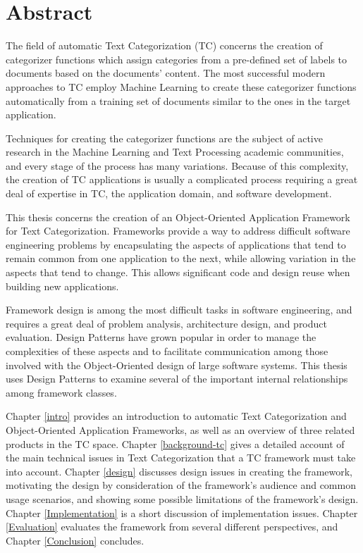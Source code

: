 \chapter{Abstract}

The field of automatic Text Categorization (TC) concerns the creation
of categorizer functions which assign categories from a pre-defined
set of labels to documents based on the documents' content.  The most
successful modern approaches to TC employ Machine Learning to create
these categorizer functions automatically from a training set of
documents similar to the ones in the target application.

Techniques for creating the categorizer functions are the subject of
active research in the Machine Learning and Text Processing academic
communities, and every stage of the process has many variations.
Because of this complexity, the creation of TC applications is usually
a complicated process requiring a great deal of expertise in TC, the
application domain, and software development.

This thesis concerns the creation of an Object-Oriented Application
Framework for Text Categorization.  Frameworks provide a way to
address difficult software engineering problems by encapsulating the
aspects of applications that tend to remain common from one
application to the next, while allowing variation in the aspects that
tend to change.  This allows significant code and design reuse when
building new applications.

Framework design is among the most difficult tasks in software
engineering, and requires a great deal of problem analysis,
architecture design, and product evaluation.  Design Patterns have
grown popular in order to manage the complexities of these aspects and
to facilitate communication among those involved with the
Object-Oriented design of large software systems.  This thesis uses
Design Patterns to examine several of the important internal
relationships among framework classes.

Chapter \ref{intro} provides an introduction to automatic Text
Categorization and Object-Oriented Application Frameworks, as well as
an overview of three related products in the TC space.
Chapter \ref{background-tc} gives a detailed account of the main technical
issues in Text Categorization that a TC framework must take into
account.  Chapter \ref{design} discusses design issues in creating the
framework, motivating the design by consideration of the
framework's audience and common usage scenarios, and showing some
possible limitations of the framework's design.  Chapter
\ref{Implementation} is a short discussion of implementation issues.
Chapter \ref{Evaluation} evaluates the framework from several
different perspectives, and Chapter \ref{Conclusion} concludes.

